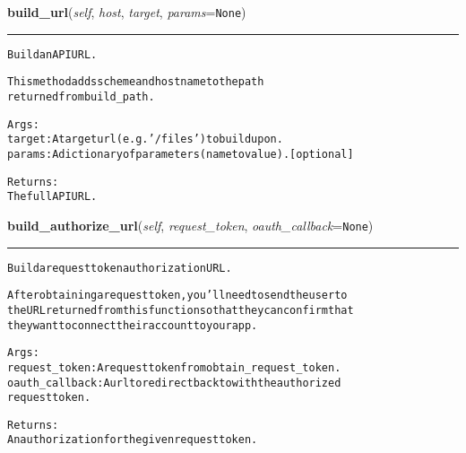     \vspace{0.5ex}

\hspace{.8\funcindent}\begin{boxedminipage}{\funcwidth}

    \raggedright \textbf{build\_url}(\textit{self}, \textit{host}, \textit{target}, \textit{params}={\tt None})

    \vspace{-1.5ex}

    \rule{\textwidth}{0.5\fboxrule}
\setlength{\parskip}{2ex}
\begin{alltt}
Build an API URL.

This method adds scheme and hostname to the path
returned from build\_path.

Args:
    target: A target url (e.g. '/files') to build upon.
    params: A dictionary of parameters (name to value). [optional]

Returns:
    The full API URL.
\end{alltt}

\setlength{\parskip}{1ex}
    \end{boxedminipage}

    \label{lib:dropbox:DropboxSession:build_authorize_url}

    \vspace{0.5ex}

\hspace{.8\funcindent}\begin{boxedminipage}{\funcwidth}

    \raggedright \textbf{build\_authorize\_url}(\textit{self}, \textit{request\_token}, \textit{oauth\_callback}={\tt None})

    \vspace{-1.5ex}

    \rule{\textwidth}{0.5\fboxrule}
\setlength{\parskip}{2ex}
\begin{alltt}
Build a request token authorization URL.

After obtaining a request token, you'll need to send the user to
the URL returned from this function so that they can confirm that
they want to connect their account to your app.

Args:
    request\_token: A request token from obtain\_request\_token.
    oauth\_callback: A url to redirect back to with the authorized
        request token.

Returns:
    An authorization for the given request token.
\end{alltt}

\setlength{\parskip}{1ex}
    \end{boxedminipage}

